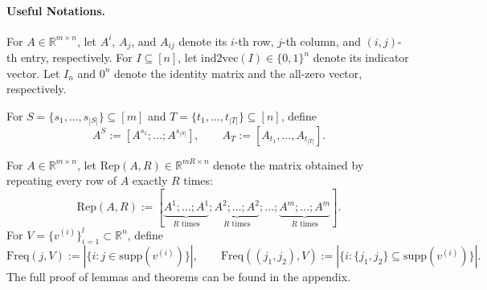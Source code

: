 \documentclass[10pt,a4paper]{amsart}
\newcommand{\xl}[1]{{\color{blue}#1}}
\newcommand{\supp}{\mathrm{supp}}
\begin{document}



\paragraph{Useful Notations.}
For $A\in\mathbb{R}^{m\times n}$, let $A^i$, $A_j$, and $A_{ij}$ denote its $i$-th row, $j$-th column, and $(i,j)$-th entry, respectively. For $I\subseteq[n]$, let $\mathrm{ind2vec}(I)\in\{0,1\}^n$ denote its indicator vector. Let $I_n$ and $0^n$ denote the identity matrix and the all-zero vector, respectively.

For $S=\{s_1,\dots,s_{|S|}\}\subseteq[m]$ and $T=\{t_1,\dots,t_{|T|}\}\subseteq[n]$, define
\[
A^S:=[A^{s_1};\dots;A^{s_{|S|}}],
\qquad
A_T:=[A_{t_1},\dots,A_{t_{|T|}}].
\]

For $A\in\mathbb{R}^{m\times n}$, let $\mathrm{Rep}(A,R)\in\mathbb{R}^{mR\times n}$ denote the matrix obtained by repeating every row of $A$ exactly $R$ times:
\[
\mathrm{Rep}(A,R)
:=
[\underbrace{A^1;\dots;A^1}_{R\text{ times}};
\underbrace{A^2;\dots;A^2}_{R\text{ times}};
\dots;
\underbrace{A^m;\dots;A^m}_{R\text{ times}}].
\]
For $V=\{v^{(i)}\}_{i=1}^l\subset\mathbb{R}^n$, define
\[
\mathrm{Freq}(j,V):=
|\{i:j\in\supp(v^{(i)})\}|,
\qquad
\mathrm{Freq}((j_1,j_2),V):=
|\{i:\{j_1,j_2\}\subseteq\supp(v^{(i)})\}|.
\]
The full proof of lemmas and theorems can be found in the appendix.

%



\end{document}
